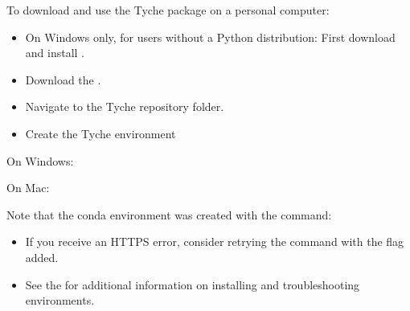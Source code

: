 \documentclass[letterpaper,10pt,english]{sphinxmanual}
\begin{document}
To download and use the Tyche package on a personal computer:
\begin{itemize}
\item {} 
On Windows only, for users without a Python distribution: First download and install .

\item {} 
Download the .

\item {} 
Navigate to the Tyche repository folder.

\item {} 
Create the Tyche environment

\end{itemize}

On Windows:

\begin{sphinxVerbatim}[commandchars=\\\{\}]
    \PYGZbs{}
  
\end{sphinxVerbatim}

On Mac:

\begin{sphinxVerbatim}[commandchars=\\\{\}]
    
  
\end{sphinxVerbatim}

Note that the conda environment was created with the command:

\begin{sphinxVerbatim}[commandchars=\\\{\}]
              
\end{sphinxVerbatim}
\begin{itemize}
\item {} 
If you receive an HTTPS error, consider retrying the command with the  flag added.

\item {} 
See the  for additional information on installing and troubleshooting environments.

\end{itemize}
\end{document}
